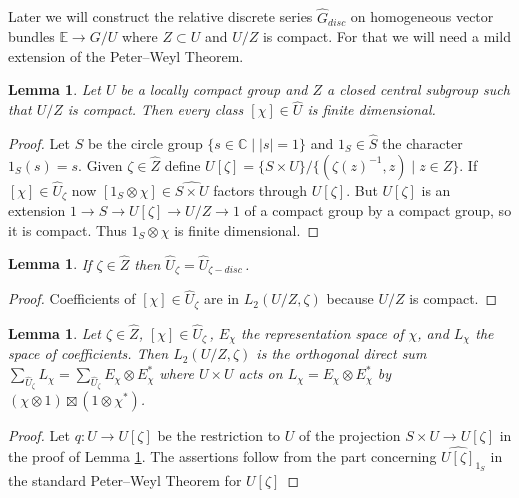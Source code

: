 \documentclass{conm-p-l}
\newtheorem{lemma}[equation]{Lemma}
\def\C{\mathbb{C}}
\def\E{\mathbb{E}}
\begin{document}
\subsection{}\label{ssec2d} 
\setcounter{equation}{0}
Later we will construct the relative 
discrete series $\widehat{G}_{disc}$ on homogeneous vector bundles
$\E \to G/U$ where $Z \subset U$ and $U/Z$ is compact.  For that
we will need a mild extension of the Peter--Weyl Theorem.
\begin{lemma}\label{2.4.1}
Let $U$ be a locally compact group and $Z$ a closed central
subgroup such that $U/Z$ is compact.  Then every class $[\chi]
\in \widehat{U}$ is finite dimensional.
\end{lemma}
\begin{proof}
Let $S$ be the circle group $\{s \in \C \mid |s|=1\}$ and
$1_S \in \widehat{S}$ the character $1_S(s) = s$.  Given
$\zeta \in \widehat{Z}$ define
$U[\zeta] = \{S\times U\}/\{(\zeta(z)^{-1},z)\mid z \in Z\}$.
If $[\chi] \in \widehat{U}_\zeta$ now 
$[1_S\otimes \chi] \in \widehat{S\times U}$
factors through $U[\zeta]$.  But $U[\zeta]$ is an extension
$1 \to S \to U[\zeta] \to U/Z \to 1$ of a compact group by a
compact group, so it is compact.  Thus $1_S\otimes \chi$
is finite dimensional.
\end{proof}

\begin{lemma}\label{2.4.2}
If $\zeta \in \widehat{Z}$ then 
$\widehat{U}_\zeta = \widehat{U}_{\zeta-disc}$\,.
\end{lemma}
\begin{proof} Coefficients of $[\chi] \in \widehat{U}_\zeta$
are in $L_2(U/Z,\zeta)$ because $U/Z$ is compact.
\end{proof}

\begin{lemma}\label{2.4.3}
Let $\zeta \in \widehat{Z}$, $[\chi] \in \widehat{U}_\zeta$\,,
$E_\chi$ the representation space of $\chi$, and $L_\chi$ the
space of coefficients.  Then $L_2(U/Z,\zeta)$ is the orthogonal direct
sum $\sum_{\widehat{U}_\zeta}L_\chi 
= \sum_{\widehat{U}_\zeta} E_\chi \otimes E_\chi^*$ where $U\times U$
acts on $L_\chi = E_\chi \otimes E_\chi^*$ by 
$(\chi \otimes 1)\boxtimes (1\otimes \chi^*)$.
\end{lemma}
\begin{proof} Let $q:U \to U[\zeta]$ be the restriction to $U$ of the
projection $S \times U \to U[\zeta]$ in the proof of Lemma \ref{2.4.1}.  The 
assertions follow from the part concerning $\widehat{U[\zeta]}_{1_S}$ in
the standard Peter--Weyl Theorem for $U[\zeta]$
\end{proof}
\end{document}

